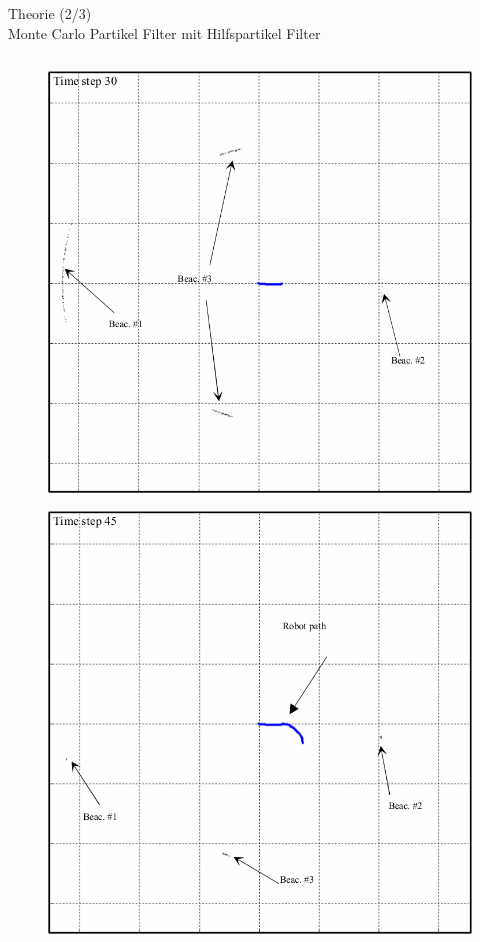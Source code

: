 \documentclass{beamer}
\begin{document}
\begin{frame}{Theorie (2/3)\\Monte Carlo Partikel Filter mit Hilfspartikel Filter}
\begin{columns}
\begin{overlayarea}{\textwidth}{.7\textheight}
{\begin{figure}
						\caption{\cite{blanco2008pure}}
					\end{figure}
				}
				{
					\begin{figure}
						\centering
						\includegraphics[width=\linewidth]{blanco2008pure_fig3g}
						\caption{\cite{blanco2008pure}}
					\end{figure}
				}
				{
					\begin{figure}
						\centering
						\includegraphics[width=\linewidth]{blanco2008pure_fig3h}

\end{figure}}
\end{overlayarea}
\end{columns}
\end{frame}
\end{document}
